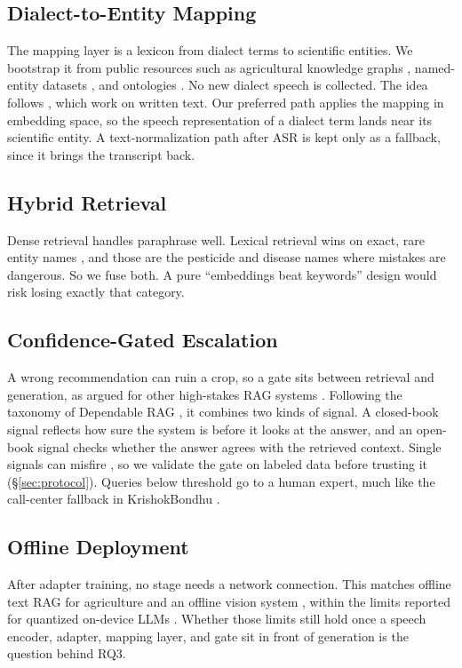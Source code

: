 \documentclass[conference]{IEEEtran}
\begin{document}
\subsection{Dialect-to-Entity Mapping}\label{sec:dialect}
The mapping layer is a lexicon from dialect terms to scientific entities. We bootstrap it from public resources such as agricultural knowledge graphs \cite{wu2026cropgraphrag}, named-entity datasets \cite{yao2024agcner}, and ontologies \cite{kgeditorial2023}. No new dialect speech is collected. The idea follows \cite{liu2025colloquialpest,hossain2026bengalirag}, which work on written text. Our preferred path applies the mapping in embedding space, so the speech representation of a dialect term lands near its scientific entity. A text-normalization path after ASR is kept only as a fallback, since it brings the transcript back.

\subsection{Hybrid Retrieval}\label{sec:hybrid}
Dense retrieval handles paraphrase well. Lexical retrieval wins on exact, rare entity names \cite{sultania2024hybridsearch}, and those are the pesticide and disease names where mistakes are dangerous. So we fuse both. A pure ``embeddings beat keywords'' design would risk losing exactly that category.

\subsection{Confidence-Gated Escalation}\label{sec:gate}
A wrong recommendation can ruin a crop, so a gate sits between retrieval and generation, as argued for other high-stakes RAG systems \cite{abstinence2025}. Following the taxonomy of Dependable RAG \cite{dependablerag2026}, it combines two kinds of signal. A closed-book signal reflects how sure the system is before it looks at the answer, and an open-book signal checks whether the answer agrees with the retrieved context. Single signals can misfire \cite{intrygue2026}, so we validate the gate on labeled data before trusting it (\S\ref{sec:protocol}). Queries below threshold go to a human expert, much like the call-center fallback in KrishokBondhu \cite{ameen2026krishokbondhu}.

\subsection{Offline Deployment}\label{sec:offline}
After adapter training, no stage needs a network connection. This matches offline text RAG for agriculture \cite{dubey2025aahar,hossain2026bengalirag} and an offline vision system \cite{tigray2025plantdisease}, within the limits reported for quantized on-device LLMs \cite{compactllm2026}. Whether those limits still hold once a speech encoder, adapter, mapping layer, and gate sit in front of generation is the question behind RQ3.
\end{document}
